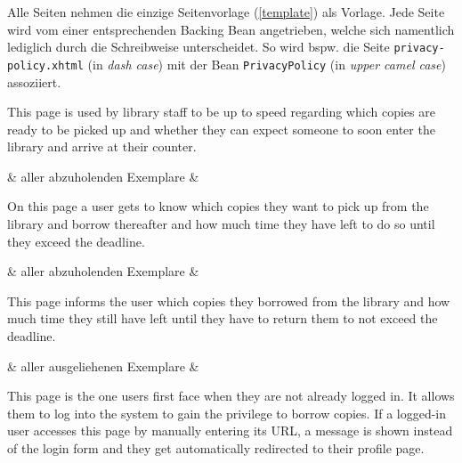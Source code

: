 \documentclass{article}
\begin{document}
Alle Seiten nehmen die einzige Seitenvorlage (\ref{template}) als Vorlage.
Jede Seite wird vom einer entsprechenden Backing Bean angetrieben, welche sich namentlich lediglich durch die Schreibweise unterscheidet. So wird bspw. die Seite \texttt{privacy-policy.xhtml} (in \textit{dash case}) mit der Bean \texttt{PrivacyPolicy} (in \textit{upper camel case}) assoziiert.


\Javadoc
This page is used by library staff to be up to speed regarding which copies are ready to be picked up and
whether they can expect someone to soon enter the library and arrive at their counter.

\begin{controls}
    \LST & aller abzuholenden Exemplare & \BIB\\
\end{controls}


\Javadoc
On this page a user gets to know which copies they want to pick up from the library and borrow thereafter
and how much time they have left to do so until they exceed the deadline.

\begin{controls}
    \LST & aller abzuholenden Exemplare & \USR\\
\end{controls}


\Javadoc
This page informs the user which copies they borrowed from the library and how much time they still have left
until they have to return them to not exceed the deadline.

\begin{controls}
    \LST & aller ausgeliehenen Exemplare & \USR\\
\end{controls}


\Javadoc
This page is the one users first face when they are not already logged in.
It allows them to log into the system to gain the privilege to borrow copies.
If a logged-in user accesses this page by manually entering its URL, a message is shown instead of the
login form and they get automatically redirected to their profile page.
\end{document}
